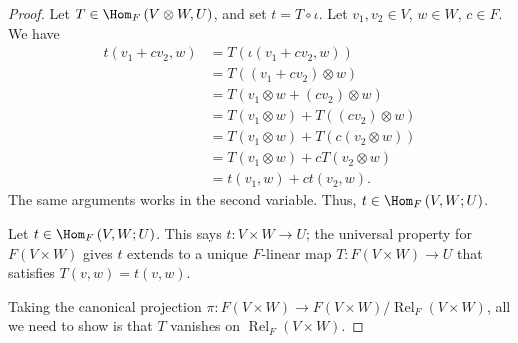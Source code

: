 \documentclass[10pt]{mypackage}
\begin{document}
  \begin{proof}
    Let $T\in \Hom_{F}\left(V\otimes W,U\right)$, and set $t = T\circ \iota$. Let $v_1,v_2\in V$, $w\in W$, $c\in F$. We have
    \begin{align*}
      t\left(v_1+cv_2,w\right) &= T\left(\iota\left(v_1 + cv_2,w\right)\right)\\
                               &= T\left(\left(v_1 + cv_2\right)\otimes w\right)\\
                               &= T\left(v_1\otimes w + \left(cv_2\right)\otimes w\right)\\
                               &= T\left(v_1\otimes w\right) + T\left(\left(cv_2\right)\otimes w\right)\\
                               &= T\left(v_1\otimes w\right) + T\left(c\left(v_2 \otimes w\right)\right)\\
                               &= T\left(v_1\otimes w\right) + cT\left(v_2\otimes w\right)\\
                               &= t\left(v_1,w\right) + ct\left(v_2,w\right).
    \end{align*}
    The same arguments works in the second variable. Thus, $t\in \Hom_{F}\left(V,W;U\right)$.\newline

    Let $t\in \Hom_{F}\left(V,W;U\right)$. This says $t: V\times W\rightarrow U$; the universal property for $F\left(V\times W\right)$ gives $t$ extends to a unique $F$-linear map $T: F\left(V\times W\right)\rightarrow U$ that satisfies $T\left(v,w\right) = t\left(v,w\right)$.\newline

    Taking the canonical projection $\pi: F\left(V\times W\right) \rightarrow F\left(V\times W\right)/\operatorname{Rel}_{F}\left(V\times W\right)$, all we need to show is that $T$ vanishes on $\operatorname{Rel}_{F}\left(V\times W\right)$.\newline


\end{proof}
\end{document}
